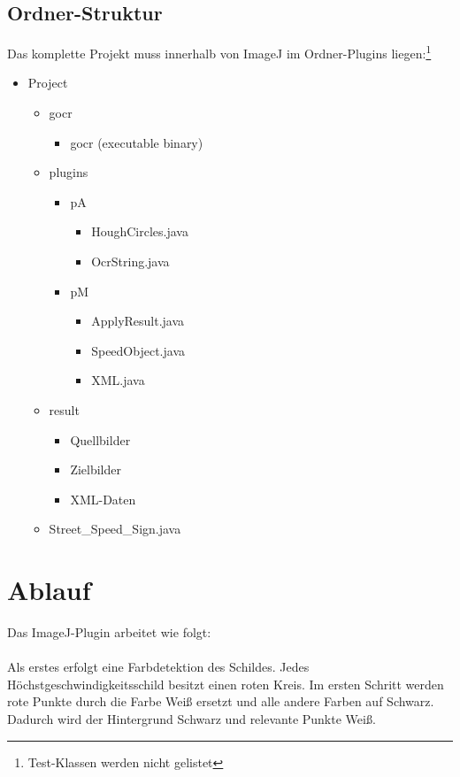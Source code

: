 \subsection{Ordner-Struktur}
Das komplette Projekt muss innerhalb von ImageJ im Ordner-Plugins liegen:\footnote{Test-Klassen werden nicht gelistet}
	\begin{itemize}
		\item Project
		\begin{itemize}
			\item gocr
				\begin{itemize}
					\item gocr (executable binary)
				\end{itemize}
			\item plugins
				\begin{itemize}
					\item pA
					\begin{itemize}
						\item HoughCircles.java
						\item OcrString.java
					\end{itemize}
					\item pM
					\begin{itemize}
						\item ApplyResult.java
						\item SpeedObject.java
						\item XML.java
					\end{itemize}
				\end{itemize}
			\item result
			\begin{itemize}
				\item Quellbilder
				\item Zielbilder
				\item XML-Daten
			\end{itemize}
			\item Street\_Speed\_Sign.java
		\end{itemize}
	\end{itemize}

\pagebreak
\section{Ablauf}
Das ImageJ-Plugin arbeitet wie folgt:

\paragraph*{}
Als erstes erfolgt eine Farbdetektion des Schildes.
Jedes Höchstgeschwindigkeitsschild besitzt einen roten Kreis.
Im ersten Schritt werden rote Punkte durch die Farbe Weiß ersetzt und alle andere Farben auf Schwarz.
Dadurch wird der Hintergrund Schwarz und relevante Punkte Weiß.


